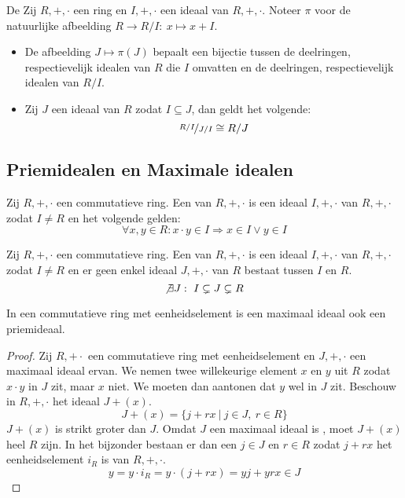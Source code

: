 \documentclass[main.tex]{subfiles}
\begin{document}
\begin{st}
  De 
  Zij $R,+,\cdot$ een ring en $I,+,\cdot$ een ideaal van $R,+,\cdot$.
  Noteer $\pi$ voor de natuurlijke afbeelding $R \rightarrow R/I:\ x \mapsto x+I$.
  \begin{itemize}
  \item De afbeelding $J\mapsto \pi(J)$ bepaalt een bijectie tussen de deelringen, respectievelijk idealen van $R$ die $I$ omvatten en de deelringen, respectievelijk idealen van $R/I$.
  \item Zij $J$ een ideaal van $R$ zodat $I \subseteq J$, dan geldt het volgende:
    \[ \nicefrac{R/I}{J/I} \cong R/J \]
  \end{itemize}
\end{st}

\subsection{Priemidealen en Maximale idealen}
\label{sec:priem-en-maxim}

\begin{de}
  Zij $R,+,\cdot$ een commutatieve ring.
  Een  van $R,+,\cdot$ is een ideaal $I,+,\cdot$ van $R,+,\cdot$ zodat $I\neq R$ en het volgende gelden:
  \[ \forall x,y \in R: x \cdot y \in I \Rightarrow x \in I \vee y \in I \]
\end{de}

\begin{de}
  Zij $R,+,\cdot$ een commutatieve ring.
  Een  van $R,+,\cdot$ is een ideaal $I,+,\cdot$ van $R,+,\cdot$ zodat $I\neq R$ en er geen enkel ideaal $J,+,\cdot$ van $R$ bestaat tussen $I$ en $R$.
  \[ \not\exists J:\ I \subsetneq J \subsetneq R \]
\end{de}

\begin{ei}
  In een commutatieve ring met eenheidselement is een maximaal ideaal ook een priemideaal.

  \begin{proof}
    Zij $R,+\cdot$ een commutatieve ring met eenheidselement en $J,+,\cdot$ een maximaal ideaal ervan.
    We nemen twee willekeurige element $x$ en $y$ uit $R$ zodat $x\cdot y$ in $J$ zit, maar $x$ niet.
    We moeten dan aantonen dat $y$ wel in $J$ zit.
    Beschouw in $R,+,\cdot$ het ideaal $J+(x)$.
    \[ J + (x) = \{ j + rx\ |\ j\in J,\ r\in R \} \]
    $J+(x)$ is strikt groter dan $J$. \waarom
    Omdat $J$ een maximaal ideaal is , moet $J+(x)$ heel $R$ zijn. \waarom
    In het bijzonder bestaan er dan een $j\in J$ en $r\in R$ zodat $j+rx$ het eenheidselement $i_{R}$ is van $R,+,\cdot$.
    \[ y = y\cdot i_{R} = y \cdot (j+rx) = yj + yrx \in J \]
  \end{proof}
\end{ei}
\end{document}
